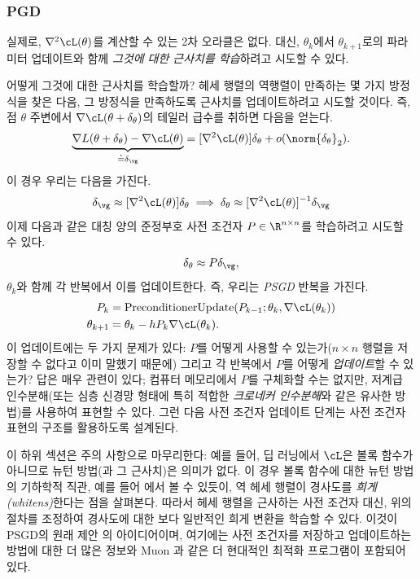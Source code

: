 \documentclass[../../book-main_ko.tex]{subfiles}
\begin{document}
\subsubsection{PGD}

실제로, \(\nabla^{2}\cL(\theta)\)를 계산할 수 있는 2차 오라클은 없다. 대신, \(\theta_{k}\)에서 \(\theta_{k + 1}\)로의 파라미터 업데이트와 함께 \textit{그것에 대한 근사치를 학습}하려고 시도할 수 있다.

어떻게 그것에 대한 근사치를 학습할까? 헤세 행렬의 역행렬이 만족하는 몇 가지 방정식을 찾은 다음, 그 방정식을 만족하도록 근사치를 업데이트하려고 시도할 것이다. 즉, 점 \(\theta\) 주변에서 \(\nabla \cL(\theta + \delta_{\theta})\)의 테일러 급수를 취하면 다음을 얻는다.
\begin{equation}
    \underbrace{\nabla L(\theta + \delta_{\theta}) - \nabla \cL(\theta)}_{\doteq \delta_{\vg}} = [\nabla^{2} \cL(\theta)]\delta_{\theta} + o(\norm{\delta_{\theta}}_{2}).
\end{equation}
이 경우 우리는 다음을 가진다.
\begin{equation}
    \delta_{\vg} \approx [\nabla^{2}\cL(\theta)]\delta_{\theta} \implies \delta_{\theta} \approx [\nabla^{2}\cL(\theta)]^{-1}\delta_{\vg}
\end{equation}
이제 다음과 같은 대칭 양의 준정부호 사전 조건자 \(P \in \R^{n \times n}\)를 학습하려고 시도할 수 있다.
\begin{equation}
    \delta_{\theta} \approx P\delta_{\vg},
\end{equation}
\(\theta_{k}\)와 함께 각 반복에서 이를 업데이트한다. 즉, 우리는 \textit{PSGD} 반복을 가진다.
\begin{align}
    P_{k}
    &= \mathrm{PreconditionerUpdate}(P_{k - 1}; \theta_{k}, \nabla \cL(\theta_{k})) \\ 
    \theta_{k + 1}
    &= \theta_{k} - hP_{k}\nabla \cL(\theta_{k}).
\end{align}
이 업데이트에는 두 가지 문제가 있다: \(P\)를 어떻게 사용할 수 있는가(\(n \times n\) 행렬을 저장할 수 없다고 이미 말했기 때문에) 그리고 각 반복에서 \(P\)를 어떻게 \textit{업데이트}할 수 있는가? 답은 매우 관련이 있다; 컴퓨터 메모리에서 \(P\)를 구체화할 수는 없지만, 저계급 인수분해(또는 심층 신경망 형태에 특히 적합한 \textit{크로네커 인수분해}와 같은 유사한 방법)를 사용하여 표현할 수 있다. 그런 다음 사전 조건자 업데이트 단계는 사전 조건자 표현의 구조를 활용하도록 설계된다.

이 하위 섹션은 주의 사항으로 마무리한다: 예를 들어, 딥 러닝에서 \(\cL\)은 볼록 함수가 아니므로 뉴턴 방법(과 그 근사치)은 의미가 없다. 이 경우 볼록 함수에 대한 뉴턴 방법의 기하학적 직관, 예를 들어 에서 볼 수 있듯이, 역 헤세 행렬이 경사도를 \textit{희게(whitens)}한다는 점을 살펴본다. 따라서 헤세 행렬을 근사하는 사전 조건자 대신, 위의 절차를 조정하여 경사도에 대한 보다 일반적인 희게 변환을 학습할 수 있다. 이것이 PSGD의 원래 제안 \cite{li2017preconditioned}의 아이디어이며, 여기에는 사전 조건자를 저장하고 업데이트하는 방법에 대한 더 많은 정보와 Muon \cite{liu2025muon}과 같은 더 현대적인 최적화 프로그램이 포함되어 있다.
\end{document}
